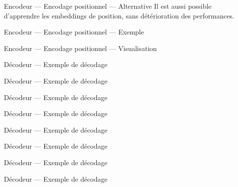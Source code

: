 \begin{frame}{Encodeur --- Encodage positionnel --- Alternative}
  Il est aussi possible d'apprendre les embeddings de position, sans détérioration des performances.
\end{frame}

\begin{frame}{Encodeur --- Encodage positionnel --- Exemple}
\end{frame}

\begin{frame}{Encodeur --- Encodage positionnel --- Visualisation}
\end{frame}

\begin{frame}{Décodeur --- Exemple de décodage}
\end{frame}

\begin{frame}{Décodeur --- Exemple de décodage}
\end{frame}

\begin{frame}{Décodeur --- Exemple de décodage}
\end{frame}

\begin{frame}{Décodeur --- Exemple de décodage}
\end{frame}

\begin{frame}{Décodeur --- Exemple de décodage}
\end{frame}

\begin{frame}{Décodeur --- Exemple de décodage}
\end{frame}

\begin{frame}{Décodeur --- Exemple de décodage}
\end{frame}

\begin{frame}{Décodeur --- Exemple de décodage}
\end{frame}

